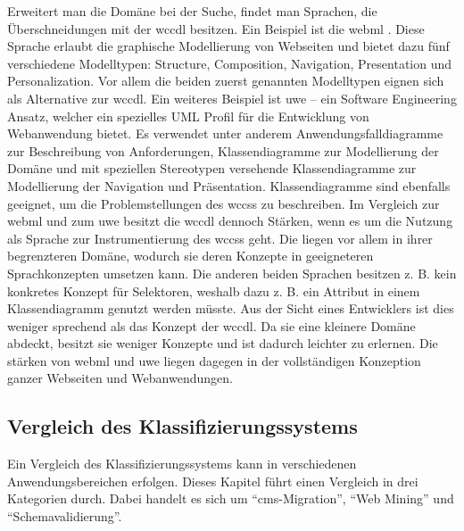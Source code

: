         Erweitert man die Domäne bei der Suche, findet man Sprachen,
        die Überschneidungen mit der \gls{wccdl} besitzen.
        Ein Beispiel ist die \gls{webml} \cite{ceri:webML}.
        Diese Sprache erlaubt die graphische Modellierung von Webseiten
        und bietet dazu fünf verschiedene Modelltypen:
        Structure, Composition, Navigation, Presentation und Personalization.
        Vor allem die beiden zuerst genannten Modelltypen eignen sich
        als Alternative zur \gls{wccdl}.
        Ein weiteres Beispiel ist \gls{uwe} \cite{koch:uwe} --
        ein Software Engineering Ansatz,
        welcher ein spezielles UML Profil für die Entwicklung von Webanwendung bietet.
        Es verwendet unter anderem Anwendungsfalldiagramme zur Beschreibung von Anforderungen,
        Klassendiagramme zur Modellierung der Domäne
        und mit speziellen Stereotypen versehende Klassendiagramme zur Modellierung der Navigation
        und Präsentation.
        Klassendiagramme sind ebenfalls geeignet, um die Problemstellungen des \glspl{wccs} zu beschreiben.
        Im Vergleich zur \gls{webml} und zum \gls{uwe} besitzt die \gls{wccdl} dennoch Stärken,
        wenn es um die Nutzung als Sprache zur Instrumentierung des \glspl{wccs} geht.
        Die liegen vor allem in ihrer begrenzteren Domäne,
        wodurch sie deren Konzepte in geeigneteren Sprachkonzepten umsetzen kann.
        Die anderen beiden Sprachen besitzen z. B. kein konkretes Konzept für
        Selektoren, weshalb dazu z. B. ein Attribut in einem Klassendiagramm genutzt werden müsste.
        Aus der Sicht eines Entwicklers ist dies weniger sprechend als das Konzept der \gls{wccdl}.
        Da sie eine kleinere Domäne abdeckt, besitzt sie weniger Konzepte
        und ist dadurch leichter zu erlernen.
        Die stärken von \gls{webml} und \gls{uwe} liegen dagegen in der vollständigen Konzeption
        ganzer Webseiten und Webanwendungen.
    
    \subsection{Vergleich des Klassifizierungssystems}
        \label{section:discussionComparisonClassificationSystem}
        Ein Vergleich des Klassifizierungssystems kann in verschiedenen Anwendungsbereichen erfolgen.
        Dieses Kapitel führt einen Vergleich in drei Kategorien durch.
        Dabei handelt es sich um "`\gls{cms}-Migration"', "`Web Mining"'
        und "`Schemavalidierung"'.

